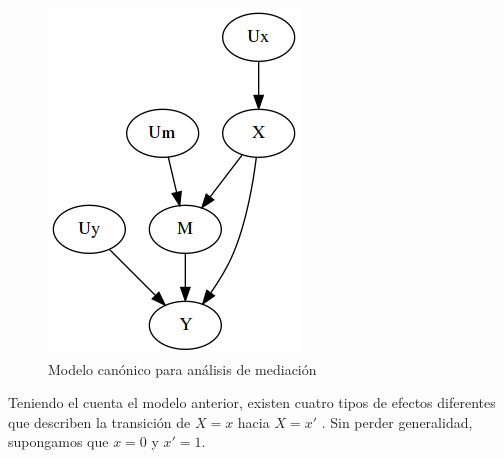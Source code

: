 \begin{figure}[!h]
	\centering
	\includegraphics[width=0.35\linewidth]{./images/Chapter 2/mediation.png}
	\caption{Modelo canónico para análisis de mediación}
	\label{fig:mediation}
\end{figure} 

Teniendo el cuenta el modelo anterior, existen cuatro tipos de efectos diferentes que describen la transición de $X=x$ hacia $X=x'$ \cite{pearl2016causal}. Sin perder generalidad, supongamos que $x=0$ y $x'=1$.

